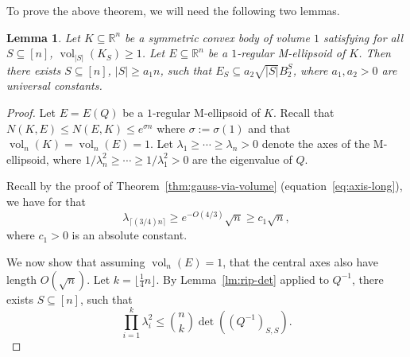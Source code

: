 \documentclass[11pt]{article}
\newtheorem{lemma}[theorem]{Lemma}
\newcommand{\ceil}[1]{\lceil #1 \rceil}
\newcommand{\floor}[1]{\lfloor #1 \rfloor}
\newcommand{\R}{{\mathbb{R}}}
\DeclareMathOperator{\vol}{vol}
\begin{document}
To prove the above theorem, we will need the following two lemmas.  
\begin{lemma}
\label{lem:axis-m-ell}
Let $K \subseteq \R^n$ be a symmetric convex body of volume $1$ satisfying for
all $S \subseteq [n]$, $\vol_{|S|}(K_S) \geq 1$. Let $E \subseteq \R^n$ be a
$1$-regular M-ellipsoid of $K$. Then there exists $S \subseteq [n]$, $|S| \geq
a_1 n$, such that $E_S \subseteq a_2 \sqrt{|S|} B_2^S$, where $a_1,a_2 > 0$ are
universal constants.
\end{lemma}
\begin{proof}
Let $E = E(Q)$ be a $1$-regular M-ellipsoid of $K$. Recall that $N(K,E) \leq
N(E,K) \leq e^{\sigma n}$ where $\sigma := \sigma(1)$ and that
$\vol_n(K)=\vol_n(E)=1$. Let $\lambda_1 \geq \cdots \geq \lambda_n > 0$ denote
the axes of the M-ellipsoid, where $1/\lambda_n^2 \geq \cdots \geq 1/\lambda^2_1
> 0$ are the eigenvalue of $Q$.

Recall by the proof of Theorem~\ref{thm:gauss-via-volume}
(equation~\eqref{eq:axis-long}), we have for that 
\begin{equation}
\label{eq:axes-long}
\lambda_{\ceil{(3/4)n}} \geq e^{-O(4/3)}\sqrt{n} \geq c_1 \sqrt{n}, 
\end{equation}
where $c_1 > 0$ is an absolute constant. 

We now show that assuming $\vol_n(E)=1$, that the central axes also have length
$O(\sqrt{n})$. Let $k = \floor{\frac{1}{4} n}$. By Lemma~\ref{lm:rip-det}
applied to $Q^{-1}$, there exists $S \subseteq [n]$, such that
\begin{equation}
\label{eq:short-axes}
\prod_{i=1}^k \lambda_i^2 \leq \binom{n}{k} \det((Q^{-1})_{S,S}). 
\end{equation}


\end{proof}
\end{document}
